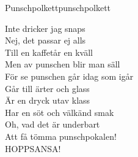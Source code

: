 \begin{song}{Punschpolkett}{punschpolkett}
\begin{vers}
Inte dricker jag snaps\\
Nej, det passar ej alls\\
Till en kaffetår en kväll\\
Men av punschen blir man säll\\
För se punschen går idag som igår\\
Går till ärter och glass\\
Är en dryck utav klass\\
Har en söt och välkänd smak\\
Oh, vad det är underbart\\
Att få tömma punschpokalen!\\
HOPPSANSA!\\
\end{vers}
\end{song}
